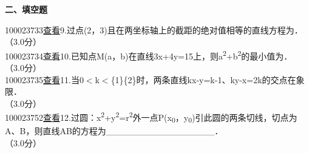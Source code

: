 \documentclass[a4paper,11pt]{article}
\begin{document}
\textbf{二、填空题}

 \hspace*{0.333em}100023733\hspace*{0.333em}\hspace*{0.333em}\href{../question/viewQuestionDetail.jsp?questionID=100023733&amp;testPaperId=100229072}{查看}\hspace*{0.333em}\hspace*{0.333em}9.过点(2，3)且在两坐标轴上的截距的绝对值相等的直线方程为． \\
\hspace*{0.333em}\hspace*{0.333em}（3.0分）\\


 \hspace*{0.333em}100023734\hspace*{0.333em}\hspace*{0.333em}\href{../question/viewQuestionDetail.jsp?questionID=100023734&amp;testPaperId=100229072}{查看}\hspace*{0.333em}\hspace*{0.333em}10.已知点M(a，b)在直线3x+4y=15上，则a\textsuperscript{2}+b\textsuperscript{2}的最小值为．\\
\hspace*{0.333em}\hspace*{0.333em}（3.0分）\\


 \hspace*{0.333em}100023735\hspace*{0.333em}\hspace*{0.333em}\href{../question/viewQuestionDetail.jsp?questionID=100023735&amp;testPaperId=100229072}{查看}\hspace*{0.333em}\hspace*{0.333em}11.当0$<$k$<$\frac\{1\}\{2\}时，两条直线kx-y=k-1、ky-x=2k的交点在象限．\\
\hspace*{0.333em}\hspace*{0.333em}（3.0分）\\


 \hspace*{0.333em}100023752\hspace*{0.333em}\hspace*{0.333em}\href{../question/viewQuestionDetail.jsp?questionID=100023752&amp;testPaperId=100229072}{查看}\hspace*{0.333em}\hspace*{0.333em}12.过圆：x\textsuperscript{2}+y\textsuperscript{2}=r\textsuperscript{2}外一点P(x\textsubscript{0}，y\textsubscript{0})引此圆的两条切线，切点为A、B，则直线AB的方程为\_\_\_\_\_\_\_\_\_\_\_\_\_\_\_\_\_．\\
\hspace*{0.333em}\hspace*{0.333em}（3.0分）\\
\end{document}
